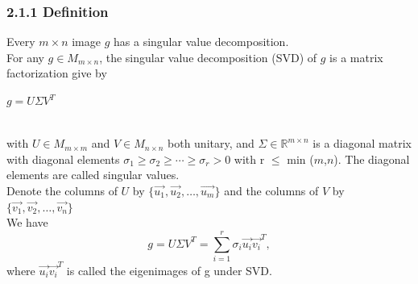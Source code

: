 \documentclass[12pt]{article}
\begin{document}
\subsubsection*{2.1.1 \quad Definition}
Every $m\times n$ image $g$ has a singular value decomposition.\\
For any $g \in M_{m \times n}$, the singular value decomposition (SVD) of $g$ is
 a matrix factorization give by \\
 \centerline{$g = U \Sigma V^T$}\\
 with $U \in M_{m \times m}$ and $V \in M_{n \times n}$ both unitary, and $\Sigma \in 
 \mathbb{R}^{m \times n}$ is a diagonal matrix with diagonal elements 
 $\sigma_1 \geq\sigma_2\geq\cdots\geq\sigma_r > 0$ with r $\leq$ min ($m$,$n$). 
 The diagonal elements are called singular values. \\
Denote the columns of $U$ by $\{\vec{u_1},\vec{u_2},\ldots,\vec{u_m}\}$ and the columns of $V$ by $\{\vec{v_1},\vec{v_2},\ldots,\vec{v_n}\}$\\
We have 
\begin{equation*}
    g = U \Sigma V^T = \sum_{i=1}^{r}\sigma_i \vec{u_i}\vec{v_i}^T,
\end{equation*} 
where $\vec{u_i}\vec{v_i}^T$ is called the eigenimages of g under SVD.
\end{document}
